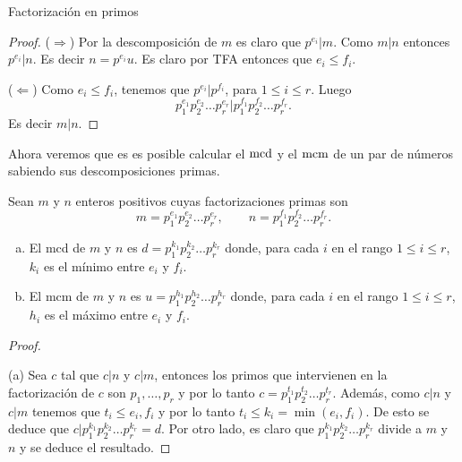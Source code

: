 \begin{section}{Factorización en primos}
\begin{proof}
\noindent($\Rightarrow$) Por la descomposición de $m$ es claro que $p^{e_i}|m$. Como $m|n$ entonces   $p^{e_i}|n$. Es decir $n =  p^{e_i}u$. Es claro por TFA entonces que $e_i \le f_i$.

\noindent($\Leftarrow$) Como $e_i \le f_i$, tenemos que $p^{e_i}|p^{f_i}$, para $1 \le i \le r$.  Luego  $$p_1^{e_1}p_2^{e_2}\ldots p_r^{e_r}| p_1^{f_1}p_2^{f_2}\ldots p_r^{f_r}.$$ Es decir $m|n$.
\end{proof}


%


Ahora veremos que es es posible calcular el $\operatorname{mcd}$ y el $\operatorname{mcm}$ de un par de números sabiendo sus descomposiciones primas.

\begin{proposicion}
Sean $m$ y $n$ enteros positivos cuyas factorizaciones primas son
$$
m=p_1^{e_1}p_2^{e_2}\ldots p_r^{e_r},\qquad
n=p_1^{f_1}p_2^{f_2}\ldots p_r^{f_r}.
$$
\begin{enumerate}[a)]
\item El mcd de $m$ y $n$ es $d=p_1^{k_1}p_2^{k_2}\ldots
p_r^{k_r}$ donde, para cada $i$ en el rango $1\le i \le r$, $k_i$
es el mínimo entre $e_i$ y $f_i$.
\item El mcm de $m$ y $n$ es $u=p_1^{h_1}p_2^{h_2}\ldots
p_r^{h_r}$ donde, para cada $i$ en el rango $1\le i \le r$, $h_i$
es el máximo entre $e_i$ y $f_i$.
\end{enumerate}
\end{proposicion}
\begin{proof}
\

\noindent(a) Sea $c$ tal que $c|n$ y $c|m$, entonces los primos que intervienen en la factorización de $c$ son $p_1,\ldots,p_r$ y por lo tanto $c =  p_1^{t_1}p_2^{t_2}\ldots p_r^{t_r}$. Además, como $c|n$ y $c|m$ tenemos que $t_i \le e_i,f_i$ y por lo tanto $t_i \le k_i = \min(e_i,f_i)$. De esto se deduce que $c|p_1^{k_1}p_2^{k_2}\ldots p_r^{k_r}=d$. Por otro lado, es claro  que  $p_1^{k_1}p_2^{k_2}\ldots p_r^{k_r}$ divide a $m$ y $n$ y se deduce el resultado.


\end{proof}
\end{section}
